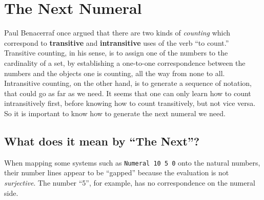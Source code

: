 \documentclass[\main/thesis.tex]{subfiles}
\begin{document}
\section{The Next Numeral}\label{next}

Paul Benacerraf once argued\cite{benacerraf1965numbers} that
there are two kinds of \textit{counting} which correspond to \textbf{transitive}
and \textbf{intransitive} uses of the verb ``to count.''
Transitive counting, in his sense, is to assign one of the numbers to the
cardinality of a set,
by establishing a one-to-one correspondence between the numbers and the objects
one is counting, all the way from none to all.
Intransitive counting, on the other hand, is to generate a sequence of notation,
that could go as far as we need.
It seems that one can only learn how to count intransitively first,
before knowing how to count transitively, but not vice versa.
So it is important to know how to generate the next numeral we need.

\subsection{What does it mean by ``The Next''?}

When mapping some systems such as {\lstinline|Numeral 10 5 0|} onto the natural
numbers, their number lines appear to be ``gapped'' because the evaluation is
not \textit{surjective}.
The number ``5'', for example, has no correspondence on the numeral side.

\begin{center}
    \begin{adjustbox}{max width=\textwidth}
    \end{adjustbox}
\end{center}
\end{document}
